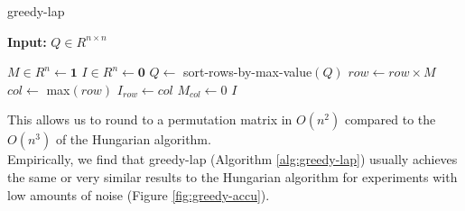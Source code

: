 \begin{algorithm}[H]
\caption{greedy-lap}\label{alg:greedy-lap}
    \textbf{Input:} $Q \in R^{n \times n}$
    \begin{algorithmic}
        \State $M \in R^n \gets \boldsymbol{1}$     
        \State $I \in R^n \gets \boldsymbol{0}$ 
        \State $Q \gets$ sort-rows-by-max-value$(Q)$
            \State $row \gets row\times M$ 
            \State $col \gets$ max$(row)$
            \State $I_{row} \gets col$
            \State $M_{col} \gets 0$
        \EndFor
        \State \Return $I$
    \end{algorithmic}
\end{algorithm}

This allows us to round to a permutation matrix in $O(n^2)$ compared to the $O(n^3)$ of the Hungarian algorithm.\\


Empirically, we find that greedy-lap (Algorithm \ref{alg:greedy-lap}) usually achieves the same or very similar results to the Hungarian algorithm for experiments with low amounts of noise (Figure \ref{fig:greedy-accu}).

